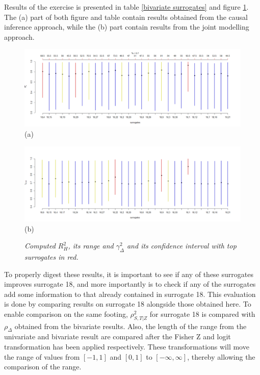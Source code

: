 \documentclass[a4paper,12pt]{article}
\begin{document}
	Results of the exercise is presented in table \ref{bivariate surrogates} and figure \ref{bivariatesurrogateplots}. The (a) part of both figure and table contain results obtained from the causal inference approach, while the (b) part contain results from the joint modelling approach.
	
	\begin{figure}[H]
		\begin{minipage}{0.5\textwidth}
			\includegraphics[scale=0.34]{bivariateSurrogateResultsMICA.png}\\(a)
		\end{minipage}
		\begin{minipage}{0.5\textwidth}
			\includegraphics[scale=0.34]{bivariateSurrogateResultsMAA.png}\\(b)
		\end{minipage}
		\caption{\emph{Computed $R^2_{H}$, its range and $\gamma^2_{\Delta}$ and its confidence interval with top surrogates in red.} }\label{bivariatesurrogateplots}
	\end{figure}
	
	To properly digest these results, it is important to see if any of these surrogates improves surrogate 18, and more importantly is to check if any of the surrogates add some information to that already contained in surrogate 18. This evaluation is done by comparing results on surrogate 18 alongside those obtained here. To enable comparison on the same footing,  $\rho_{S,T|Z}^2$ for surrogate 18 is  compared with $\rho_{\Delta}$ obtained from the bivariate results. Also, the length of the range from the univariate and bivariate result are compared after the Fisher Z and logit transformation has been applied respectively. These transformations will move the range of values from $[-1,1]$ and $[0,1]$ to $[-\infty,\infty]$, thereby allowing the comparison of the range.\\
	
\end{document}
